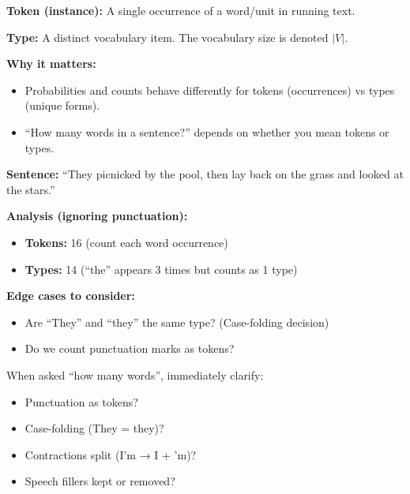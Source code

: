 \begin{defbox}
\textbf{Token (instance):} A single occurrence of a word/unit in running text.

\textbf{Type:} A distinct vocabulary item. The vocabulary size is denoted $|V|$.

\separator

\textbf{Why it matters:}
\begin{itemize}
  \item Probabilities and counts behave differently for tokens (occurrences) vs types (unique forms).
  \item ``How many words in a sentence?'' depends on whether you mean tokens or types.
\end{itemize}
\end{defbox}

\begin{exbox}
\textbf{Sentence:} ``They picnicked by the pool, then lay back on the grass and looked at the stars.''

\textbf{Analysis (ignoring punctuation):}
\begin{itemize}
  \item \textbf{Tokens:} 16 (count each word occurrence)
  \item \textbf{Types:} 14 (``the'' appears 3 times but counts as 1 type)
\end{itemize}

\textbf{Edge cases to consider:}
\begin{itemize}
  \item Are ``They'' and ``they'' the same type? (Case-folding decision)
  \item Do we count punctuation marks as tokens?
\end{itemize}
\end{exbox}

\begin{tipbox}
When asked ``how many words'', immediately clarify:
\begin{itemize}
  \item Punctuation as tokens?
  \item Case-folding (They = they)?
  \item Contractions split (I'm → I + 'm)?
  \item Speech fillers kept or removed?
\end{itemize}
\end{tipbox}

\separator

